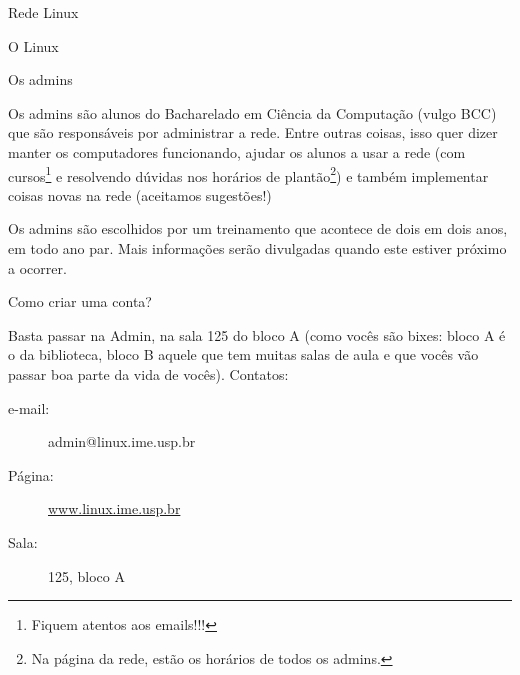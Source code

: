 \begin{subsecao}{Rede Linux}
\begin{subsubsecao}{O Linux}
\end{subsubsecao}

\begin{subsubsecao}{Os admins}

Os admins são alunos do Bacharelado em Ciência da Computação (vulgo BCC) que
são responsáveis por administrar a rede. Entre outras coisas, isso quer dizer
manter os computadores funcionando, ajudar os alunos a usar a rede (com
cursos\footnote{ Fiquem atentos aos emails!!!} e resolvendo dúvidas nos
horários de plantão\footnote{ Na página da rede, estão os horários de todos os
admins.}) e também implementar coisas novas na rede (aceitamos sugestões!)

Os admins são escolhidos por um treinamento que acontece de dois em dois anos,
em todo ano par. Mais informações serão divulgadas quando este estiver próximo
a ocorrer.

\end{subsubsecao}
\begin{subsubsecao}{Como criar uma conta?}

Basta passar na Admin, na sala 125 do bloco A (como vocês são bixes: bloco A é o da
biblioteca, bloco B aquele que tem muitas salas de aula e que vocês vão passar boa
parte da vida de vocês). Contatos:

\vspace{-1em}

\begin{description}
\item [e-mail:] admin@linux.ime.usp.br
\item [Página:] \url{www.linux.ime.usp.br}
\item [Sala:] 125, bloco A
\end{description}

\vspace{-.5em}

\end{subsubsecao}

\end{subsecao}
